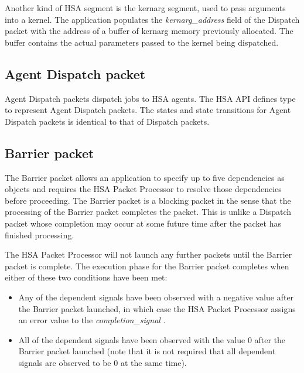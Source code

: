 \documentclass[final]{book}
\newcommand{\reffld}[1]{\textit{#1}}
\newcommand{\mariotodo}[1]{\todo[color=CarnationPink]{#1}}
\begin{document}
Another kind of HSA segment is the kernarg segment, used to pass arguments into
a kernel. The application populates the \reffld{kernarg_address} field of the
Dispatch packet with the address of a buffer of kernarg memory previously
allocated. The buffer contains the
actual parameters passed to the kernel being dispatched.

\subsection{Agent Dispatch packet}\label{agent-packet}

Agent Dispatch packets dispatch jobs to HSA agents. The HSA API defines type
 to represent Agent Dispatch packets.
The states and state transitions for Agent Dispatch packets is identical to that
of Dispatch packets.

\subsection{Barrier packet}\label{barrier-packet}

The Barrier packet  allows an application to
specify up to five dependencies as  objects and
requires the HSA Packet Processor to resolve those dependencies before proceeding.
The Barrier packet is a blocking packet in the sense that the processing of the
Barrier packet completes the packet. This is unlike a Dispatch packet whose
completion may occur at some future time after the packet has finished
processing.

The HSA Packet Processor will not launch any further packets until the Barrier
packet is complete. The execution phase for the Barrier packet completes when
either of these two conditions have been met:
\begin{itemize}
\item Any of the dependent signals have been observed with a negative value
  after the Barrier packet launched, in which case the HSA Packet
  Processor assigns an error value to the \reffld{completion_signal} .
\item All of the dependent signals have been observed with the value 0 after
  the Barrier packet launched (note that it is not required that all dependent
  signals are observed to be 0 at the same time).
\end{itemize}
\end{document}
